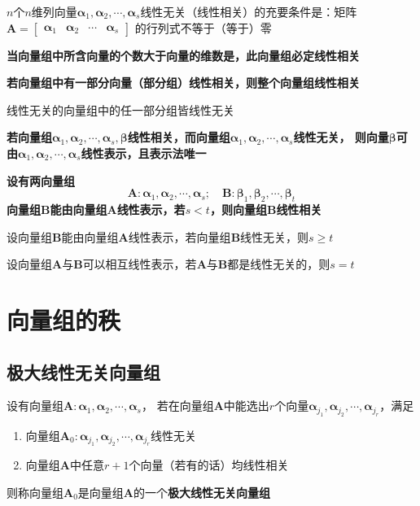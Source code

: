 \documentclass[UTF8]{ctexart}
\newcommand{\ve}[1]{{\bm{#1}}}
\newcommand{\mat}[1]{\ve{#1}}
\newcommand{\emplin}{\vspace{1em}}
\begin{document}
$n$个$n$维列向量$\mat{\alpha}_1,\mat{\alpha}_2,\cdots,\mat{\alpha}_s$线性无关（线性相关）的充要条件是：矩阵$\mat{A}=\begin{bmatrix}\mat{\alpha}_1&\mat{\alpha}_2&\cdots&\mat{\alpha}_s\end{bmatrix}$
的行列式不等于（等于）零

\textbf{当向量组中所含向量的个数大于向量的维数是，此向量组必定线性相关}

\emplin
\emplin

\textbf{若向量组中有一部分向量（部分组）线性相关，则整个向量组线性相关}

线性无关的向量组中的任一部分组皆线性无关

\emplin
\emplin

\textbf{若向量组$\mat{\alpha}_1,\mat{\alpha}_2,\cdots,\mat{\alpha}_s,\mat{\beta}$线性相关，而向量组$\mat{\alpha}_1,\mat{\alpha}_2,\cdots,\mat{\alpha}_s$线性无关，
则向量$\mat{\beta}$可由$\mat{\alpha}_1,\mat{\alpha}_2,\cdots,\mat{\alpha}_s$线性表示，且表示法唯一}

\emplin
\emplin

\textbf{设有两向量组
\[\mat{A}:\mat{\alpha}_1,\mat{\alpha}_2,\cdots,\mat{\alpha}_s;\quad\mat{B}:\mat{\beta}_1,\mat{\beta}_2,\cdots,\mat{\beta}_t\]
向量组$\mat{B}$能由向量组$\mat{A}$线性表示，若$s<t$，则向量组$\mat{B}$线性相关}

设向量组$\mat{B}$能由向量组$\mat{A}$线性表示，若向量组$\mat{B}$线性无关，则$s\ge t$

设向量组$\mat{A}$与$\mat{B}$可以相互线性表示，若$\mat{A}$与$\mat{B}$都是线性无关的，则$s=t$

\section*{向量组的秩}
\subsection*{极大线性无关向量组}
设有向量组$\mat{A}:\mat{\alpha}_1,\mat{\alpha}_2,\cdots,\mat{\alpha}_s$，
若在向量组$\mat{A}$中能选出$r$个向量$\mat{\alpha}_{j_1},\mat{\alpha}_{j_2},\cdots,\mat{\alpha}_{j_r}$，满足
\begin{enumerate}
  \item 向量组$\mat{A}_0:\mat{\alpha}_{j_1},\mat{\alpha}_{j_2},\cdots,\mat{\alpha}_{j_r}$线性无关
  \item 向量组$\mat{A}$中任意$r+1$个向量（若有的话）均线性相关
\end{enumerate}
则称向量组$\mat{A}_0$是向量组$\mat{A}$的一个\textbf{极大线性无关向量组}
\end{document}

